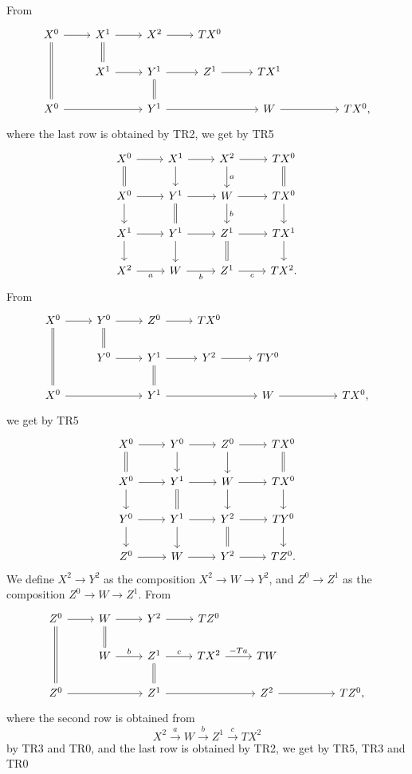 \documentclass[12pt]{article}
\theoremstyle{remark}%
\begin{document}
From 
$$
\begin{tikzcd}
X^0\ar[equal]{dd}\ar{r}&X^1\ar[equal]{d}\ar{r}&X^2\ar{r}&TX^0\\
&X^1\ar{r}&Y^1\ar[equal]{d}\ar{r}&Z^1\ar{r}&TX^1\\
X^0\ar{rr}&&Y^1\ar{rr}&&W\ar{rr}&&TX^0,
\end{tikzcd}
$$
where the last row is obtained by TR2, we get by TR5
\begin{equation}\label{v1}
\begin{tikzcd}
X^0\ar{r}\ar[equal]{d}&X^1\ar{d}\ar{r}&X^2\ar{d}{a}\ar{r}&TX^0\ar[equal]{d}\\
X^0\ar{d}\ar{r}&Y^1\ar{r}\ar[equal]{d}&W\ar{d}{b}\ar{r}&TX^0\ar{d}\\
X^1\ar{d}\ar{r}&Y^1\ar{d}\ar{r}&Z^1\ar{r}\ar[equal]{d}&TX^1\ar{d}\\
X^2\ar{r}[swap]{a}&W\ar{r}[swap]{b}&Z^1\ar{r}[swap]{c}&TX^2.
\end{tikzcd}
\end{equation}
%
From 
$$
\begin{tikzcd}
X^0\ar[equal]{dd}\ar{r}&Y^0\ar[equal]{d}\ar{r}&Z^0\ar{r}&TX^0\\
&Y^0\ar{r}&Y^1\ar[equal]{d}\ar{r}&Y^2\ar{r}&TY^0\\
X^0\ar{rr}&&Y^1\ar{rr}&&W\ar{rr}&&TX^0,
\end{tikzcd}
$$
we get by TR5
\begin{equation}\label{v2}
\begin{tikzcd}
X^0\ar{r}\ar[equal]{d}&Y^0\ar{d}\ar{r}&Z^0\ar{d}\ar{r}&TX^0\ar[equal]{d}\\
X^0\ar{d}\ar{r}&Y^1\ar{r}\ar[equal]{d}&W\ar{d}\ar{r}&TX^0\ar{d}\\
Y^0\ar{d}\ar{r}&Y^1\ar{d}\ar{r}&Y^2\ar{r}\ar[equal]{d}&TY^0\ar{d}\\
Z^0\ar{r}&W\ar{r}&Y^2\ar{r}&TZ^0.
\end{tikzcd}
\end{equation}
%
We define $X^2\to Y^2$ as the composition $X^2\to W\to Y^2$, and $Z^0\to Z^1$ as the composition $Z^0\to W\to Z^1$. From 
$$
\begin{tikzcd}
Z^0\ar[equal]{dd}\ar{r}&W\ar[equal]{d}\ar{r}&Y^2\ar{r}&TZ^0\\
&W\ar{r}{b}&Z^1\ar[equal]{d}\ar{r}{c}&TX^2\ar{r}{-Ta}&TW\\
Z^0\ar{rr}&&Z^1\ar{rr}&&Z^2\ar{rr}&&TZ^0,
\end{tikzcd}
$$
where the second row is obtained from 
$$
X^2\overset{a}{\to}W\overset{b}{\to}Z^1\overset{c}{\to}TX^2
$$
by TR3 and TR0, and the last row is obtained by TR2, we get by TR5, TR3 and TR0
\end{document}
